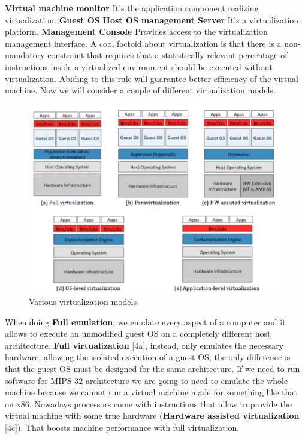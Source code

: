 \smallSpace
\textbf{Virtual machine monitor}\n
It's the application component realizing virtualization. \n
\smallSpace
\textbf{Guest OS} \n
\smallSpace
\textbf{Host OS} \n
\smallSpace
\textbf{management Server} \n
It's a virtualization platform.
\smallSpace
\textbf{Management Console} \n
Provides access to the virtualization management interface. \n
\subSpace
A cool factoid about virtualization is that there is a non-mandatory constraint that requires that a statistically relevant percentage of instructions inside a virtualized environment should be executed without virtualization. Abiding to this rule will guarantee better efficiency of the virtual machine. \n
Now we will consider a couple of different virtualization models. 
\begin{figure}
    \centering
    \includegraphics[scale=0.4]{./Images/virtualization_stacks.png}
    \caption{Various virtualization models}
\end{figure}
When doing \textbf{Full emulation}, we emulate every aspect of a computer and it allows to execute an unmodified guest OS on a completely different host architecture. \n
\miniSpace
\textbf{Full virtualization} [4a], instead, only emulates the necessary hardware, allowing the isolated execution of a guest OS, the only difference is that the guest OS must be designed for the same architecture. \n
\miniSpace
If we need to run software for MIPS-32 architecture we are going to need to emulate the whole machine because we cannot run a virtual machine made for something like that on x86. \n
\miniSpace
Nowadays processors come with instructions that allow to provide the virtual machine with some true hardware (\textbf{Hardware assisted virtualization} [4c]). That boosts machine performance with full virtualization. \n
